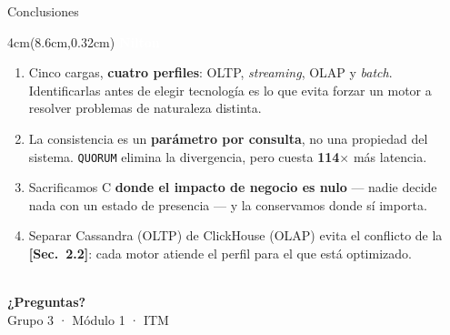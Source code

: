 \documentclass[aspectratio=169,11pt]{beamer}
\newcommand{\sect}[1]{\textcolor{acento}{\small\textbf{[Sec.~#1]}}}
\newcommand{\quien}[1]{%
  \begin{textblock*}{4cm}(8.6cm,0.32cm)
    \tiny\textcolor{white}{\textbf{#1}}
  \end{textblock*}}
\begin{document}
\begin{frame}{Conclusiones}
\quien{Nilton}
\centering


\vspace{8pt}
\begin{minipage}{0.92\textwidth}\footnotesize
\begin{enumerate}\itemsep3pt
\item Cinco cargas, \textbf{cuatro perfiles}: OLTP, \emph{streaming}, OLAP y \emph{batch}.
  Identificarlas antes de elegir tecnología es lo que evita forzar un motor a
  resolver problemas de naturaleza distinta.
\item La consistencia es un \textbf{parámetro por consulta}, no una propiedad del
  sistema. \texttt{QUORUM} elimina la divergencia, pero cuesta \textbf{114$\times$}
  más latencia.
\item Sacrificamos C \textbf{donde el impacto de negocio es nulo} — nadie decide
  nada con un estado de presencia — y la conservamos donde sí importa.
\item Separar Cassandra (OLTP) de ClickHouse (OLAP) evita el conflicto de la
  \sect{2.2}: cada motor atiende el perfil para el que está optimizado.
\end{enumerate}
\end{minipage}

\end{frame}

\begin{frame}[plain]\centering\vfill
{\logomarca[2.2]}\\[12pt]
{\Large\textcolor{cmAzul}{\textbf{¿Preguntas?}}}\\[10pt]
{\footnotesize\textcolor{cmGris}{Grupo 3 · Módulo 1 · ITM}}
\vfill\end{frame}
\end{document}
